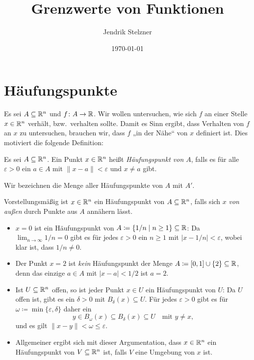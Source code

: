 \documentclass[a4paper,10pt]{article}
\title{Grenzwerte von Funktionen}
\author{Jendrik Stelzner}
\date{\today}
\begin{document}
\maketitle

\tableofcontents





\section{Häufungspunkte}


Es sei $A \subseteq \mathbb{R}^n$ und $f \colon A \to \mathbb{R}$. Wir wollen untersuchen, wie sich $f$ an einer Stelle $x \in \mathbb{R}^n$ verhält, bzw.\ verhalten sollte. Damit es Sinn ergibt, dass Verhalten von $f$ an $x$ zu untersuchen, brauchen wir, dass $f$ „in der Nähe“ von $x$ definiert ist. Dies motiviert die folgende Definition:


\begin{defi}
 Es sei $A \subseteq \mathbb{R}^n$. Ein Punkt $x \in \mathbb{R}^n$ heißt \emph{Häufungspunkt von $A$}, falls es für alle $\varepsilon > 0$ ein $a \in A$ mit $\|x-a\| < \varepsilon$ und $x \neq a$ gibt.
 
 Wir bezeichnen die Menge aller Häufungspunkte von $A$ mit $A'$.
\end{defi}


Vorstellungsmäßig ist $x \in \mathbb{R}^n$ ein Häufungspunkt von $A \subseteq \mathbb{R}^n$, falls sich $x$ \emph{von außen} durch Punkte aus $A$ annähern lässt.


\begin{bsp}
 \begin{itemize}
  \item
   $x = 0$ ist ein Häufungspunkt von $A \coloneqq \{1/n \mid n \geq 1\} \subseteq \mathbb{R}$: Da $\lim_{n \to \infty} 1/n = 0$ gibt es für jedes $\varepsilon > 0$  ein $n \geq 1$ mit $|x-1/n| < \varepsilon$, wobei klar ist, dass $1/n \neq 0$.
  \item
   Der Punkt $x = 2$ ist \emph{kein} Häufungspunkt der Menge $A \coloneqq [0,1] \cup \{2\} \subseteq \mathbb{R}$, denn das einzige $a \in A$ mit $|x-a| < 1/2$ ist $a = 2$.
  \item
   Ist $U \subseteq \mathbb{R}^n$ offen, so ist jeder Punkt $x \in U$ ein Häufungspunkt von $U$: Da $U$ offen ist, gibt es ein $\delta > 0$ mit $B_\delta(x) \subseteq U$. Für jedes $\varepsilon > 0$ gibt es für $\omega \coloneqq \min\{\varepsilon,\delta\}$ daher ein
   \[
    y \in B_\omega(x) \subseteq B_\delta(x) \subseteq U \quad \text{mit $y \neq x$},
   \]
   und es gilt $\|x-y\| < \omega \leq \varepsilon$.
  \item
   Allgemeiner ergibt sich mit dieser Argumentation, dass $x \in \mathbb{R}^n$ ein Häufungspunkt von $V \subseteq \mathbb{R}^n$ ist, falls $V$ eine Umgebung von $x$ ist.
 \end{itemize}
\end{bsp}
\end{document}
